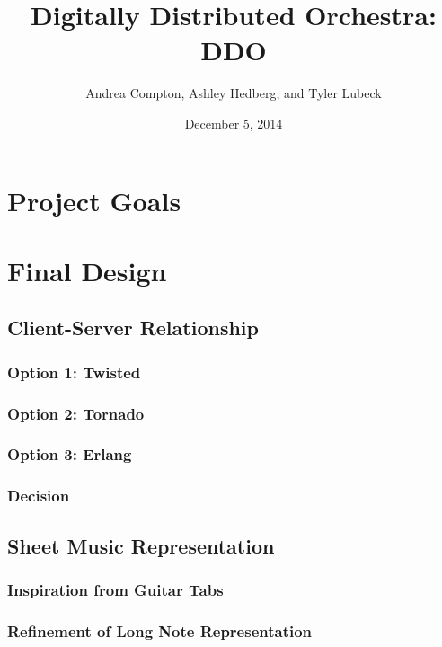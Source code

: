 \documentclass[10pt,letterpaper]{article}
\begin{document}
    \title{Digitally Distributed Orchestra: DDO}
    \author{Andrea Compton, Ashley Hedberg, and Tyler Lubeck}
    \date{December 5, 2014}
    \maketitle

    \setcounter{tocdepth}{2}
    \tableofcontents

    \section{Project Goals}


    \section{Final Design}

        \subsection{Client-Server Relationship}
            \subsubsection{Option 1: Twisted}
            \subsubsection{Option 2: Tornado}
            \subsubsection{Option 3: Erlang}
            \subsubsection{Decision}

        \subsection{Sheet Music Representation}
            \subsubsection{Inspiration from Guitar Tabs}
            \subsubsection{Refinement of Long Note Representation}
\end{document}
